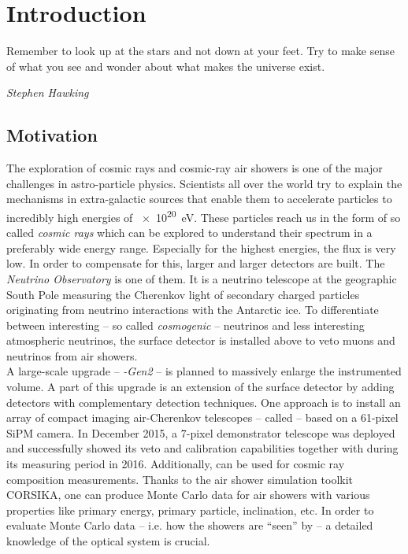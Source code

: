 \chapter{Introduction}

\epigraph{\frqq Remember to look up at the stars and not down at your feet. Try to make sense of what you see and wonder about what makes the universe exist.\flqq}{\textit{Stephen Hawking}}

\section{Motivation}

The exploration of cosmic rays and cosmic-ray air showers is one of the major challenges in astro-particle physics. Scientists all over the world try to explain the mechanisms in extra-galactic sources that enable them to accelerate particles to incredibly high energies of \SI{e20}{\electronvolt}. These particles reach us in the form of so called \textit{cosmic rays} which can be explored to understand their spectrum in a preferably wide energy range. Especially for the highest energies, the flux is very low. In order to compensate for this, larger and larger detectors are built. The \textit{\icecube Neutrino Observatory} is one of them. It is a neutrino telescope at the geographic South Pole measuring the Cherenkov light of secondary charged particles originating from neutrino interactions with the Antarctic ice. To differentiate between interesting -- so called \textit{cosmogenic} -- neutrinos and less interesting atmospheric neutrinos, the surface detector \icetop is installed above \icecube to veto muons and neutrinos from air showers.\\

A large-scale upgrade -- \textit{\icecube-Gen2} -- is planned to massively enlarge the instrumented volume. A part of this upgrade is an extension of the surface detector by adding detectors with complementary detection techniques. One approach is to install an array of compact imaging air-Cherenkov telescopes -- called \textit{\iceact} -- based on a 61-pixel SiPM camera. In December 2015, a 7-pixel demonstrator telescope was deployed and successfully showed its veto and calibration capabilities together with \icetop during its measuring period in 2016. Additionally, \iceact can be used for cosmic ray composition measurements. Thanks to the air shower simulation toolkit CORSIKA, one can produce Monte Carlo data for air showers with various properties like primary energy, primary particle, inclination, etc. In order to evaluate Monte Carlo data -- i.e. how the showers are \enquote{seen} by \iceact\xspace -- a detailed knowledge of the optical system is crucial.\\


